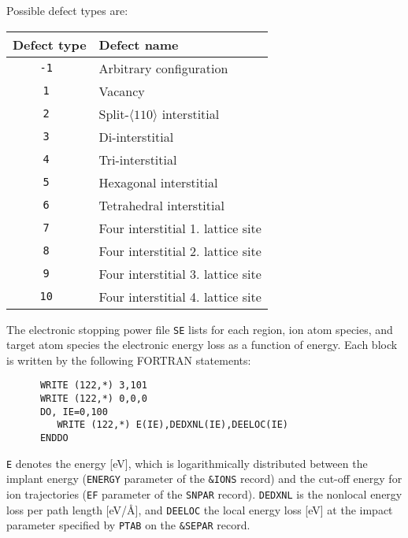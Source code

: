 Possible defect types are:
%
\bigskip
%
\begin{center}
\begin{tabular}{|c|p{}|}
\hline
Defect type & Defect name                               \\
\hline
\tt -1      & Arbitrary configuration                   \\
\tt 1       & Vacancy                                   \\
\tt 2       & Split-$\langle 110 \rangle$ interstitial  \\
\tt 3       & Di-interstitial                           \\
\tt 4       & Tri-interstitial                          \\
\tt 5       & Hexagonal interstitial                    \\
\tt 6       & Tetrahedral interstitial                  \\
\tt 7       & Four interstitial 1. lattice site         \\
\tt 8       & Four interstitial 2. lattice site         \\
\tt 9       & Four interstitial 3. lattice site         \\
\tt 10      & Four interstitial 4. lattice site         \\
\hline
\end{tabular}
\end{center}

\bigskip
\fi

The electronic stopping power file \texttt{SE} lists for each region, ion atom
species, and target atom species the electronic energy loss as a function of
energy. Each block is written by the following FORTRAN statements:
%
\begin{verbatim}
      WRITE (122,*) 3,101
      WRITE (122,*) 0,0,0
      DO, IE=0,100
         WRITE (122,*) E(IE),DEDXNL(IE),DEELOC(IE)
      ENDDO
\end{verbatim}
%
\texttt{E} denotes the energy [eV], which is logarithmically distributed between
the implant energy (\texttt{ENERGY} parameter of the \texttt{\&IONS} record) and
the cut-off energy for ion trajectories (\texttt{EF} parameter of the
\texttt{SNPAR} record). \texttt{DEDXNL} is the nonlocal energy loss per path
length [eV/\AA], and \texttt{DEELOC} the local energy loss [eV] at the impact
parameter specified by \texttt{PTAB} on the \texttt{\&SEPAR} record.

